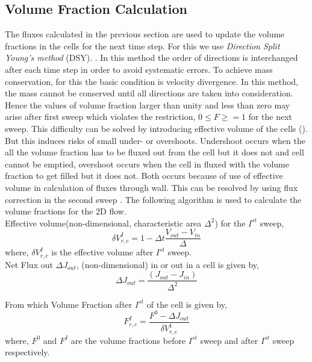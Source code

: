 \subsection{Volume Fraction Calculation}
The fluxes calculated in the previous section are used to update the volume fractions in the cells for the next time step. For this we use \textit{Direction Split Young's method} (DSY).
\cite{Youngs1982}. In this method the order of directions is interchanged after each time step in order to avoid systematic errors. To achieve mass conservation, for this the 
basic condition is velocity divergence. In this method, the mass cannot be conserved until all directions are taken into consideration. Hence the values of volume fraction larger than unity
and less than zero may arise after first sweep which violates the restriction, $0\leqslant F\geqslant=1$ for the next sweep. This difficulty can be solved by introducing effective 
volume of the cells (\cite{Rudman1997}). But this induces risks of small under- or overshoots. Undershoot occurs when the all the volume fraction has to be fluxed out from the cell 
but it does not and cell cannot be emptied, overshoot occurs when the cell in fluxed with the volume fraction to get filled but it does not. Both occurs because of use of effective volume
in calculation of fluxes through wall. This can be resolved by using flux correction in the second sweep \cite{Lorstad2004}. The following algorithm is used to calculate the volume 
fractions for the 2D flow. \\
Effective volume(non-dimensional, characteristic area $\Delta^2$) for the $I^{st}$ sweep,
\begin{equation*}
 \delta V^I_{r,c} = 1 - \Delta t \frac{V_{out}-V_{in}}{\Delta} 
\end{equation*}
where, $\delta V^I_{r,c}$ is the effective volume after $I^{st}$ sweep. \\
Net Flux out $\Delta J_{out}$, (non-dimensional) in or out in a cell is given by,
\begin{equation*}
 \Delta J_{out} = \frac{(J_{out}-J_{in})}{\Delta^2} 
\end{equation*}

From which Volume Fraction after $I^{st}$ of the cell is given by,
\begin{equation*}
\boxed{F_{r,c}^I =  \frac{F^0 - \Delta J_{out}}{\delta V^1_{r,c}}}
\end{equation*}
where, $F^0$ and $F^I$ are the volume fractions before $I^{st}$ sweep and after $I^{st}$ sweep respectively.

